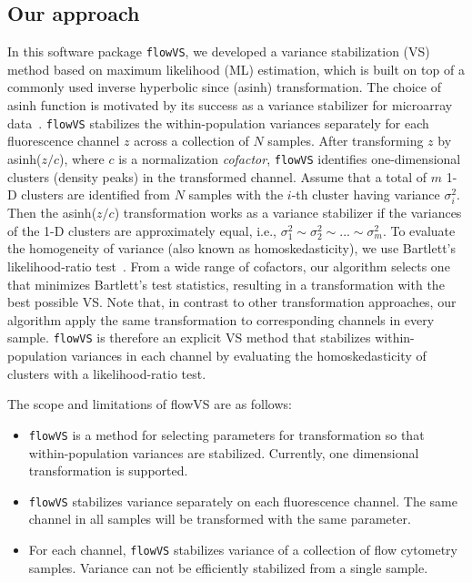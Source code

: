 \documentclass{article}\usepackage[]{graphicx}\usepackage[]{color}
\newcommand{\Rpackage}[1]{{\texttt{#1}}}
\begin{document}
\subsection{Our approach}
In this software package \Rpackage{flowVS}, we developed a variance stabilization (VS) method based on maximum likelihood (ML) estimation, which is built on top of a commonly used inverse hyperbolic since (asinh) transformation. 
The choice of asinh function is motivated by its success as a variance stabilizer for microarray data~\cite{durbin2002variance, huber2002variance}.
\Rpackage{flowVS} stabilizes the within-population variances separately for each fluorescence channel $z$ across a collection of $N$ samples.
After transforming $z$ by asinh($z/c$),  where $c$ is a normalization \emph{cofactor}, \Rpackage{flowVS} identifies one-dimensional clusters (density peaks) in the transformed channel. 
Assume that a total of $m$ 1-D clusters are identified from $N$ samples with the $i$-th cluster having variance $\sigma^2_i$.
Then the asinh($z/c$) transformation works as a variance stabilizer if the variances of the 1-D clusters are approximately equal, i.e., $\sigma^2_1 \sim \sigma^2_2\sim ... \sim \sigma^2_m$. 
To evaluate the homogeneity of variance (also known as homoskedasticity), we use  Bartlett's likelihood-ratio test~\cite{Bartlett1937}.
From a wide range of cofactors, our algorithm selects one that minimizes Bartlett's test statistics, resulting in a transformation with the best possible VS. 
Note that, in contrast to other transformation approaches, our algorithm apply the same transformation to corresponding channels in every sample.
\Rpackage{flowVS} is therefore an explicit VS method that stabilizes within-population variances in each channel by evaluating the homoskedasticity of clusters with a likelihood-ratio test.

The scope and limitations of flowVS are as follows:
\begin{itemize}
\item \Rpackage{flowVS} is a method for selecting parameters for transformation so that within-population variances are stabilized. Currently, one dimensional transformation is supported.
\item \Rpackage{flowVS} stabilizes variance separately on each fluorescence channel. The same channel in all samples will be transformed with the same parameter.
\item For each channel, \Rpackage{flowVS} stabilizes variance of a collection of flow cytometry samples. Variance can not be efficiently stabilized from a single sample.
\end{itemize}
\end{document}
